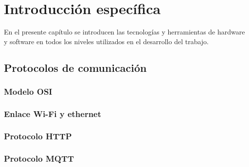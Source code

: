 \chapter{Introducción específica} %

\label{Chapter2}

En el presente capítulo se introducen las tecnologías y herramientas de hardware y software en todos los niveles utilizados en el desarrollo del trabajo. 

\section{Protocolos de comunicación}
\subsection{Modelo OSI}



\subsection{Enlace Wi-Fi y ethernet}



\subsection{Protocolo HTTP}



\subsection{Protocolo MQTT}